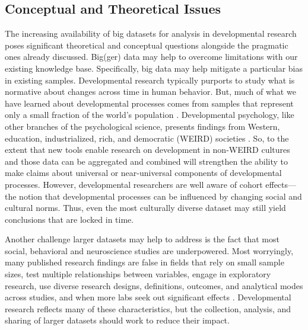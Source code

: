\documentclass[letterpaper,man,apacite,natbib]{apa6}
\begin{document}
\subsection{Conceptual and Theoretical Issues}
The increasing availability of big datasets for analysis in developmental research poses significant theoretical and conceptual questions alongside the pragmatic ones already discussed.
Big(ger) data may help to overcome limitations with our existing knowledge base.
Specifically, big data may help mitigate a particular bias in existing samples.
Developmental research typically purports to study what is normative about changes across time in human behavior.
But, much of what we have learned about developmental processes comes from samples that represent only a small fraction of the world's population \cite{karasik2010weird, fernald2010getting}.
Developmental psychology, like other branches of the psychological science, presents findings from Western, education, industrialized, rich, and democratic (WEIRD) societies \cite{henrich_weirdest_2010}.
So, to the extent that new tools enable research on development in non-WEIRD cultures and those data can be aggregated and combined will strengthen the ability to make claims about universal or near-universal components of developmental processes.
However, developmental researchers are well aware of cohort effects---the notion that developmental processes can be influenced by changing social and cultural norms.
Thus, even the most culturally diverse dataset may still yield conclusions that are locked in time.

Another challenge larger datasets may help to address is the fact that most social, behavioral \cite{maxwell_persistence_2004} and neuroscience studies \cite{button_power_2013} are underpowered.
Most worryingly, many published research findings are false in fields that rely on small sample sizes, test multiple relationships between variables, engage in exploratory research, use diverse research designs, definitions, outcomes, and analytical modes across studies, and when more labs seek out significant effects \cite{ioannidis_why_2005}.
Developmental research reflects many of these characteristics, but the collection, analysis, and sharing of larger datasets should work to reduce their impact.
\end{document}
